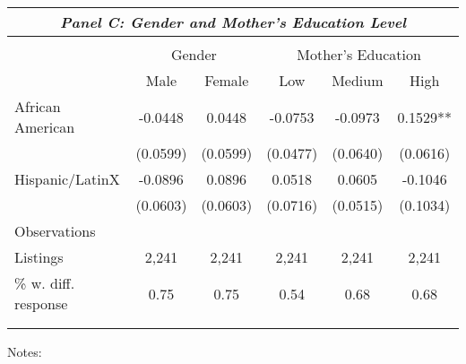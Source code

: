 \begin{table}[H]
\begin{threeparttable}
\begin{tabular}{@{\extracolsep{5pt}}lccccc}
                 \multicolumn{6}{c}{\textit{Panel C: Gender and Mother's Education Level}} \\                \hline \\[-1.8ex]                  &   \multicolumn{2}{c}{Gender} &   \multicolumn{3}{c}{Mother's Education } \\                 & Male & Female & Low  & Medium   & High  \\         
\hline
African American    &     -0.0448   &      0.0448   &     -0.0753   &     -0.0973   &      0.1529** \\
                    &    (0.0599)   &    (0.0599)   &    (0.0477)   &    (0.0640)   &    (0.0616)   \\
Hispanic/LatinX     &     -0.0896   &      0.0896   &      0.0518   &      0.0605   &     -0.1046   \\
                    &    (0.0603)   &    (0.0603)   &    (0.0716)   &    (0.0515)   &    (0.1034)   \\
\hline
\hline Observations &               &               &               &               &               \\
Listings            &       2,241   &       2,241   &       2,241   &       2,241   &       2,241   \\
\% w. diff. response&        0.75   &        0.75   &        0.54   &        0.68   &        0.68   \\
             \\[-1.8ex]\hline        \hline \\[-1.8ex]        \end{tabular}         \begin{tablenotes} \scriptsize       \item Notes:        \end{tablenotes}       \end{threeparttable}       \end{table}       
